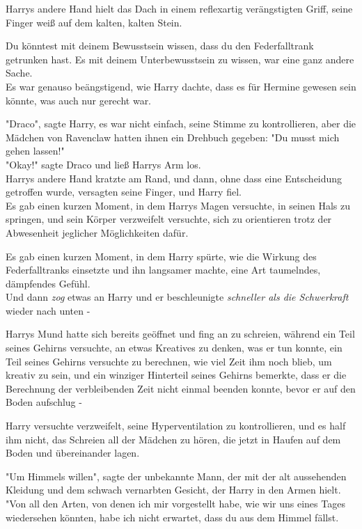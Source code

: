 {Harrys andere Hand hielt das Dach in einem reflexartig verängstigten Griff, seine Finger weiß auf dem kalten, kalten Stein.

Du könntest mit deinem Bewusstsein wissen, dass du den Federfalltrank getrunken hast. Es mit deinem Unterbewusstsein zu wissen, war eine ganz andere Sache.\\ Es war genauso beängstigend, wie Harry dachte, dass es für Hermine gewesen sein könnte, was auch nur gerecht war.

"Draco", sagte Harry, es war nicht einfach, seine Stimme zu kontrollieren, aber die Mädchen von Ravenclaw hatten ihnen ein Drehbuch gegeben: "Du musst mich gehen lassen!"\\ "Okay!" sagte Draco und ließ Harrys Arm los.\\ Harrys andere Hand kratzte am Rand, und dann, ohne dass eine Entscheidung getroffen wurde, versagten seine Finger, und Harry fiel.\\ Es gab einen kurzen Moment, in dem Harrys Magen versuchte, in seinen Hals zu springen, und sein Körper verzweifelt versuchte, sich zu orientieren trotz der Abwesenheit jeglicher Möglichkeiten dafür.

Es gab einen kurzen Moment, in dem Harry spürte, wie die Wirkung des Federfalltranks einsetzte und ihn langsamer machte, eine Art taumelndes, dämpfendes Gefühl.\\ Und dann \emph{zog} etwas an Harry und er beschleunigte \emph{schneller als die Schwerkraft} wieder nach unten -

Harrys Mund hatte sich bereits geöffnet und fing an zu schreien, während ein Teil seines Gehirns versuchte, an etwas Kreatives zu denken, was er tun konnte, ein Teil seines Gehirns versuchte zu berechnen, wie viel Zeit ihm noch blieb, um kreativ zu sein, und ein winziger Hinterteil seines Gehirns bemerkte, dass er die Berechnung der verbleibenden Zeit nicht einmal beenden konnte, bevor er auf den Boden aufschlug -

Harry versuchte verzweifelt, seine Hyperventilation zu kontrollieren, und es half ihm nicht, das Schreien all der Mädchen zu hören, die jetzt in Haufen auf dem Boden und übereinander lagen.

"Um Himmels willen", sagte der unbekannte Mann, der mit der alt aussehenden Kleidung und dem schwach vernarbten Gesicht, der Harry in den Armen hielt. "Von all den Arten, von denen ich mir vorgestellt habe, wie wir uns eines Tages wiedersehen könnten, habe ich nicht erwartet, dass du aus dem Himmel fällst.

}
